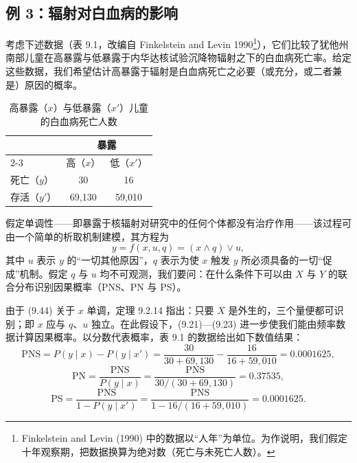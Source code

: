 \subsection{例 3：辐射对白血病的影响}

考虑下述数据（表 9.1，改编自 Finkelstein and Levin 1990\footnote{Finkelstein and Levin (1990) 中的数据以“人年”为单位。为作说明，我们假定十年观察期，把数据换算为绝对数（死亡与未死亡人数）。}），它们比较了犹他州南部儿童在高暴露与低暴露于内华达核试验沉降物辐射之下的白血病死亡率。给定这些数据，我们希望估计高暴露于辐射是白血病死亡之必要（或充分，或二者兼是）原因的概率。

\begin{table}[htbp]
\centering
\caption{高暴露（$x$）与低暴露（$x'$）儿童的白血病死亡人数}
\label{tab:9.1}
\small
\begin{tabular}{lcc}
\toprule
& \multicolumn{2}{c}{暴露}\\
\cmidrule(lr){2-3}
& 高（$x$） & 低（$x'$）\\
\midrule
死亡（$y$）   & 30     & 16\\
存活（$y'$）  & 69,130 & 59,010\\
\bottomrule
\end{tabular}
\end{table}

假定单调性——即暴露于核辐射对研究中的任何个体都没有治疗作用——该过程可由一个简单的析取机制建模，其方程为
\begin{equation}
y=f(x,u,q)=(x\wedge q)\vee u, \tag{9.44}
\end{equation}
其中 $u$ 表示 $y$ 的“一切其他原因”，$q$ 表示为使 $x$ 触发 $y$ 所必须具备的一切“促成”机制。假定 $q$ 与 $u$ 均不可观测，我们要问：在什么条件下可以由 $X$ 与 $Y$ 的联合分布识别因果概率（PNS、PN 与 PS）。

由于 \textup{(9.44)} 关于 $x$ 单调，定理 9.2.14 指出：只要 $X$ 是外生的，三个量便都可识别；即 $x$ 应与 $q$、$u$ 独立。在此假设下，\textup{(9.21)}—\textup{(9.23)} 进一步使我们能由频率数据计算因果概率。以分数代表概率，表 9.1 的数据给出如下数值结果：
\begin{equation}
\mathrm{PNS}=P(y\mid x)-P(y\mid x')=\frac{30}{30+69{,}130}-\frac{16}{16+59{,}010}=0.0001625, \tag{9.45}
\end{equation}
\begin{equation}
\mathrm{PN}=\frac{\mathrm{PNS}}{P(y\mid x)}=\frac{\mathrm{PNS}}{30/(30+69{,}130)}=0.37535, \tag{9.46}
\end{equation}
\begin{equation}
\mathrm{PS}=\frac{\mathrm{PNS}}{1-P(y\mid x')}=\frac{\mathrm{PNS}}{1-16/(16+59{,}010)}=0.0001625. \tag{9.47}
\end{equation}

